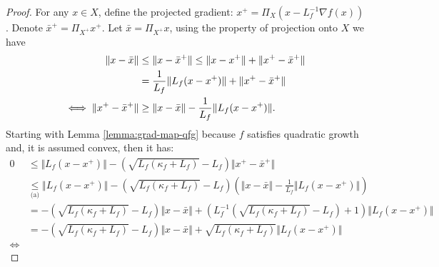 \documentclass[12pt]{report}
\begin{document}
            \begin{proof}
                For any $x \in X$, define the projected gradient: $x^+ = \Pi_{X}(x - L^{-1}_f\nabla f(x))$. 
                Denote $\bar x^+ = \Pi_{X^+}x^+$. 
                Let $\bar x = \Pi_{X^+}x$, using the property of projection onto $X$ we have 
                \begin{align}\label{ineq:thm:qfg-peb-equiv-proof-item1}
                    \Vert x - \bar x\Vert &\le \Vert x - \bar x^+\Vert
                    \le \Vert x - x^+\Vert + \Vert x^+ - \bar x^+\Vert
                    \notag\\
                    &= \frac{1}{L_f}\Vert L_f(x - x^+)\Vert + \Vert x^+ - \bar x^+\Vert
                    \notag\\
                    \iff 
                    \Vert x^+ - \bar x^+\Vert &\ge
                    \Vert x - \bar x\Vert - \frac{1}{L_f}\Vert L_f(x - x^+)\Vert. 
                \end{align}
                Starting with Lemma \ref{lemma:grad-map-qfg} because $f$ satisfies quadratic growth and, it is assumed convex, then it has: 
                {\small
                \begin{align*}
                    0 &\le 
                    \Vert L_f(x - x^+)\Vert
                    - \left(\sqrt{L_f(\kappa_f + L_f)} - L_f\right)\Vert x^+ - \bar x^+\Vert
                    \\
                    &\underset{\text{(a)}}{\le}
                    \Vert L_f(x - x^+)\Vert
                    -
                    \left(\sqrt{L_f(\kappa_f + L_f)} - L_f\right)\left(
                        \Vert x - \bar x\Vert - \frac{1}{L_f}\Vert L_f(x - x^+)\Vert
                    \right)
                    \\
                    &=
                    - \left(
                        \sqrt{L_f(\kappa_f + L_f)} - L_f
                    \right)\Vert x - \bar x\Vert
                    +
                    \left(
                        L^{-1}_f\left(\sqrt{L_f(\kappa_f + L_f)} - L_f\right) + 1
                    \right)\Vert L_f(x - x^+)\Vert
                    \\ 
                    &=
                    -\left(
                        \sqrt{L_f(\kappa_f + L_f)} - L_f
                    \right)\Vert x - \bar x\Vert
                    +
                    \sqrt{L_f(\kappa_f + L_f)}
                    \Vert L_f(x - x^+)\Vert
                    \\
                    \iff&

\end{align*}}
\end{proof}
\end{document}
